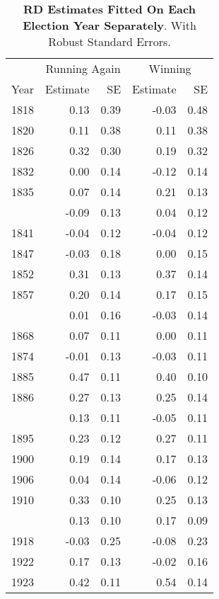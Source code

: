 \begin{table}[!h]

\caption{\textbf{RD Estimates Fitted On Each Election Year Separately}. With Robust Standard Errors.}
\centering
\begin{tabular}[t]{rrrrr}
\toprule
\multicolumn{1}{c}{ } & \multicolumn{2}{c}{Running Again} & \multicolumn{2}{c}{Winning} \\
\cmidrule(l{3pt}r{3pt}){2-3} \cmidrule(l{3pt}r{3pt}){4-5}
Year & Estimate & SE & Estimate & SE\\
\midrule
1818 & 0.13 & 0.39 & -0.03 & 0.48\\
1820 & 0.11 & 0.38 & 0.11 & 0.38\\
1826 & 0.32 & 0.30 & 0.19 & 0.32\\
1832 & 0.00 & 0.14 & -0.12 & 0.14\\
1835 & 0.07 & 0.14 & 0.21 & 0.13\\
\addlinespace
1837 & -0.09 & 0.13 & 0.04 & 0.12\\
1841 & -0.04 & 0.12 & -0.04 & 0.12\\
1847 & -0.03 & 0.18 & 0.00 & 0.15\\
1852 & 0.31 & 0.13 & 0.37 & 0.14\\
1857 & 0.20 & 0.14 & 0.17 & 0.15\\
\addlinespace
1859 & 0.01 & 0.16 & -0.03 & 0.14\\
1868 & 0.07 & 0.11 & 0.00 & 0.11\\
1874 & -0.01 & 0.13 & -0.03 & 0.11\\
1885 & 0.47 & 0.11 & 0.40 & 0.10\\
1886 & 0.27 & 0.13 & 0.25 & 0.14\\
\addlinespace
1892 & 0.13 & 0.11 & -0.05 & 0.11\\
1895 & 0.23 & 0.12 & 0.27 & 0.11\\
1900 & 0.19 & 0.14 & 0.17 & 0.13\\
1906 & 0.04 & 0.14 & -0.06 & 0.12\\
1910 & 0.33 & 0.10 & 0.25 & 0.13\\
\addlinespace
1911 & 0.13 & 0.10 & 0.17 & 0.09\\
1918 & -0.03 & 0.25 & -0.08 & 0.23\\
1922 & 0.17 & 0.13 & -0.02 & 0.16\\
1923 & 0.42 & 0.11 & 0.54 & 0.14\\
\bottomrule
\end{tabular}
\end{table}